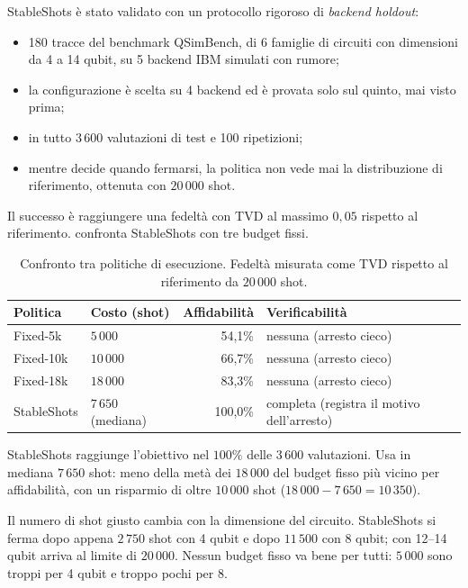 StableShots è stato validato con un protocollo rigoroso di \emph{backend holdout}:
\begin{itemize}
  \item 180 tracce del benchmark QSimBench, di 6 famiglie di circuiti con dimensioni da 4 a 14 qubit, su 5 backend IBM
    simulati con rumore;
  \item la configurazione è scelta su 4 backend ed è provata solo sul quinto, mai visto prima;
  \item in tutto 3\,600 valutazioni di test e 100 ripetizioni;
  \item mentre decide quando fermarsi, la politica non vede mai la distribuzione di riferimento, ottenuta con $20\,000$
    shot.
\end{itemize}

Il successo è raggiungere una fedeltà con TVD al massimo $0{,}05$ rispetto al riferimento. 
confronta StableShots con tre budget fissi.

\begin{table}[ht]
\centering
\small
\caption{Confronto tra politiche di esecuzione. Fedeltà misurata come TVD rispetto al riferimento da $20\,000$ shot.}
\label{tab:qse-scorecard}
\begin{tabular}{llrl}
\toprule
Politica & Costo (shot) & Affidabilità & Verificabilità \\
\midrule
Fixed-5k & $5\,000$ & 54,1\% & nessuna (arresto cieco) \\
Fixed-10k & $10\,000$ & 66,7\% & nessuna (arresto cieco) \\
Fixed-18k & $18\,000$ & 83,3\% & nessuna (arresto cieco) \\
StableShots & $7\,650$ (mediana) & 100,0\% & completa (registra il motivo dell'arresto) \\
\bottomrule
\end{tabular}
\end{table}

StableShots raggiunge l'obiettivo nel $100\%$ delle 3\,600 valutazioni. Usa in mediana $7\,650$ shot: meno della metà
dei $18\,000$ del budget fisso più vicino per affidabilità, con un risparmio di oltre $10\,000$ shot
($18\,000 - 7\,650 = 10\,350$).

\begin{attenzione}
Il numero di shot giusto cambia con la dimensione del circuito. StableShots si ferma dopo appena $2\,750$ shot con 4
qubit e dopo $11\,500$ con 8 qubit; con 12--14 qubit arriva al limite di $20\,000$. Nessun budget fisso va bene per
tutti: $5\,000$ sono troppi per 4 qubit e troppo pochi per 8.
\end{attenzione}

